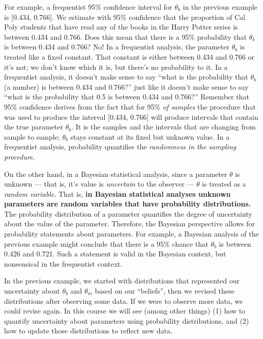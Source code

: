 \documentclass[
]{book}
\theoremstyle{definition}
\theoremstyle{definition}
\theoremstyle{definition}
\theoremstyle{remark}
\begin{document}
For example, a frequentist 95\% confidence interval for \(\theta_b\) in the previous example is {[}0.434, 0.766{]}. We estimate with 95\% confidence that the proportion of Cal Poly students that have read any of the books in the Harry Potter series is between 0.434 and 0.766. Does this mean that there is a 95\% probability that \(\theta_b\) is between 0.434 and 0.766? No! In a frequentist analysis, the parameter \(\theta_b\) is treated like a fixed constant. That constant is either between 0.434 and 0.766 or it's not; we don't know which it is, but there's no probability to it. In a frequentist analysis, it doesn't make sense to say ``what is the probability that \(\theta_b\) (a number) is between 0.434 and 0.766?'' just like it doesn't make sense to say ``what is the probability that 0.5 is between 0.434 and 0.766?'' Remember that 95\% confidence derives from the fact that for 95\% \emph{of samples} the procedure that was used to produce the interval {[}0.434, 0.766{]} will produce intervals that contain the true parameter \(\theta_b\). It is the samples and the intervals that are changing from sample to sample; \(\theta_b\) stays constant at its fixed but unknown value. In a frequentist analysis, probability quantifies the \emph{randomness in the sampling procedure}.

On the other hand, in a Bayesian statistical analysis, since a parameter \(\theta\) is unknown --- that is, it's value is \emph{uncertain} to the observer --- \(\theta\) is treated as a \emph{random variable}. That is, \textbf{in Bayesian statistical analyses unknown parameters are random variables that have probability distributions.} The probability distribution of a parameter quantifies the degree of uncertainty about the value of the parameter. Therefore, the Bayesian perspective allows for probability statements about parameters. For example, a Bayesian analysis of the previous example might conclude that there is a 95\% chance that \(\theta_b\) is between 0.426 and 0.721. Such a statement is valid in the Bayesian context, but nonsensical in the frequentist context.

In the previous example, we started with distributions that represented our uncertainty about \(\theta_b\) and \(\theta_m\) based on our ``beliefs'', then we revised these distributions after observing some data. If we were to observe more data, we could revise again. In this course we will see (among other things) (1) how to quantify uncertainty about parameters using probability distributions, and (2) how to update those distributions to reflect new data.
\end{document}

